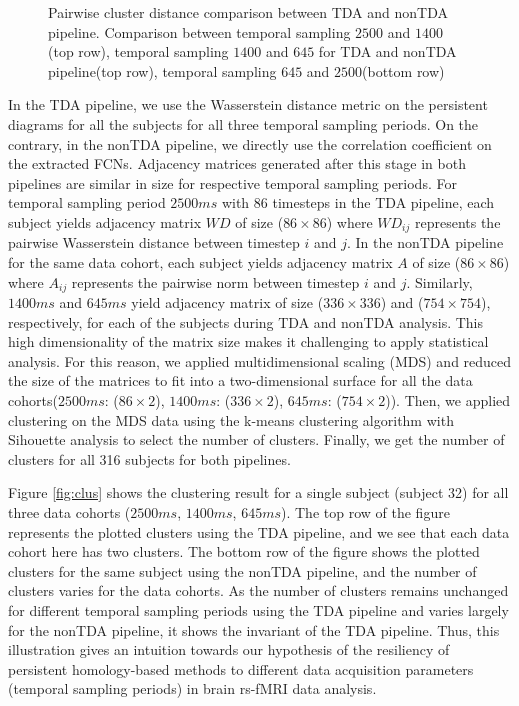 \begin{figure}[!ht]
\begin{subfigure}[!ht]{0.8\linewidth}
	\end{subfigure}
	\caption{Pairwise cluster distance comparison between TDA and nonTDA pipeline. Comparison between temporal sampling $2500$ and $1400$ (top row), temporal sampling $1400$ and $645$ for TDA and nonTDA pipeline(top row), temporal sampling $645$ and $2500$(bottom row)}
	\label{fig:clus_distance_pairwise}
\end{figure}

In the TDA pipeline, we use the Wasserstein distance metric on the persistent diagrams for all the subjects for all three temporal sampling periods. On the contrary, in the nonTDA pipeline, we directly use the correlation coefficient on the extracted FCNs. Adjacency matrices generated after this stage in both pipelines are similar in size for respective temporal sampling periods. For temporal sampling period $2500ms$ with $86$ timesteps in the TDA pipeline, each subject yields adjacency matrix $WD$ of size ($86 \times 86$) where $WD_{ij}$ represents the pairwise Wasserstein distance between timestep $i$ and $j$. In the nonTDA pipeline for the same data cohort, each subject yields adjacency matrix $A$ of size ($86 \times 86$) where $A_{ij}$ represents the pairwise norm between timestep $i$ and $j$. Similarly, $1400ms$ and $645ms$ yield adjacency matrix of size ($336 \times 336$) and ($754 \times 754$), respectively, for each of the subjects during TDA and nonTDA analysis. This high dimensionality of the matrix size makes it challenging to apply statistical analysis. For this reason, we applied multidimensional scaling (MDS) and reduced the size of the matrices to fit into a two-dimensional surface for all the data cohorts($2500ms$: ($86 \times 2$), $1400ms$: ($336 \times 2$), $645ms$: ($754 \times 2$)). Then, we applied clustering on the MDS data using the k-means clustering algorithm with Sihouette analysis to select the number of clusters. Finally, we get the number of clusters for all 316 subjects for both pipelines. 



Figure \ref{fig:clus} shows the clustering result for a single subject (subject 32) for all three data cohorts ($2500ms$, $1400ms$, $645ms$). The top row of the figure represents the plotted clusters using the TDA pipeline, and we see that each data cohort here has two clusters. The bottom row of the figure shows the plotted clusters for the same subject using the nonTDA pipeline, and the number of clusters varies for the data cohorts. As the number of clusters remains unchanged for different temporal sampling periods using the TDA pipeline and varies largely for the nonTDA pipeline, it shows the invariant of the TDA pipeline. Thus, this illustration gives an intuition towards our hypothesis of the resiliency of persistent homology-based methods to different data acquisition parameters (temporal sampling periods) in brain rs-fMRI data analysis.


